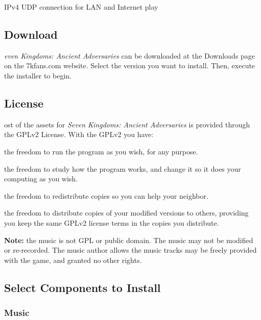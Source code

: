 
\begin{changemargin}{0.5cm}{0cm} 
IPv4 UDP connection for LAN and Internet play
\end{changemargin}

\subsection{Download}

\textit{even Kingdoms: Ancient Adversaries} can be downloaded at the Downloads page on the 7kfans.com website. Select the version you want to install. Then, execute the installer to begin.

\subsection{License}


ost of the assets for \textit{Seven Kingdoms: Ancient Adversaries} is provided through the GPLv2 License. With the GPLv2 you have: 

\begin{changemargin}{0.5cm}{0cm}
the freedom to run the program as you wish, for any purpose.

the freedom to study how the program works, and change it so it does your computing as you wish.

the freedom to redistribute copies so you can help your neighbor.

the freedom to distribute copies of your modified versions to others, providing you keep the same GPLv2 license terms in the copies you distribute.
\end{changemargin}


\textbf{Note:} the music is not GPL or public domain. The music may not be modified or re-recorded. The music author allows the music tracks may be freely provided with the game, and granted no other rights.

\subsection{Select Components to Install}


\subsubsection{Music}

